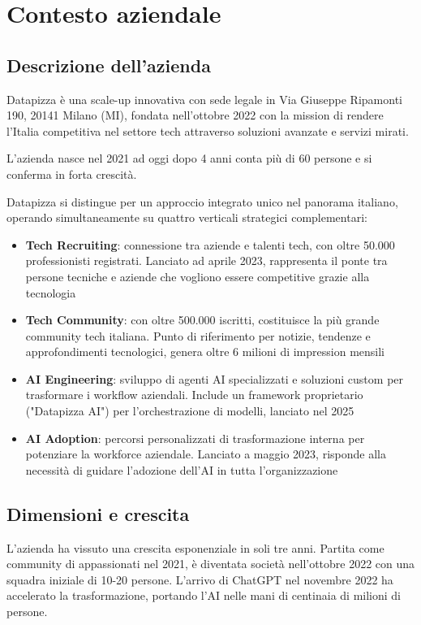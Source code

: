 \chapter{Contesto aziendale}

\section{Descrizione dell'azienda}
Datapizza è una scale-up innovativa con sede legale in Via Giuseppe Ripamonti 190, 20141 Milano (MI), fondata nell'ottobre 2022 con la mission di rendere l'Italia competitiva nel settore tech attraverso soluzioni avanzate e servizi mirati.

L'azienda nasce nel 2021 ad oggi dopo 4 anni conta più di 60 persone e si conferma in forta crescità.

Datapizza si distingue per un approccio integrato unico nel panorama italiano, operando simultaneamente su quattro verticali strategici complementari:

\begin{itemize}
  \item \textbf{Tech Recruiting}: connessione tra aziende e talenti tech, con oltre 50.000 professionisti registrati. Lanciato ad aprile 2023, rappresenta il ponte tra persone tecniche e aziende che vogliono essere competitive grazie alla tecnologia
  
  \item \textbf{Tech Community}: con oltre 500.000 iscritti, costituisce la più grande community tech italiana. Punto di riferimento per notizie, tendenze e approfondimenti tecnologici, genera oltre 6 milioni di impression mensili
  
  \item \textbf{AI Engineering}: sviluppo di agenti AI specializzati e soluzioni custom per trasformare i workflow aziendali. Include un framework proprietario ("Datapizza AI") per l'orchestrazione di modelli, lanciato nel 2025
  
  \item \textbf{AI Adoption}: percorsi personalizzati di trasformazione interna per potenziare la workforce aziendale. Lanciato a maggio 2023, risponde alla necessità di guidare l'adozione dell'AI in tutta l'organizzazione
\end{itemize}

\section{Dimensioni e crescita}
L'azienda ha vissuto una crescita esponenziale in soli tre anni. Partita come community di appassionati nel 2021, è diventata società nell'ottobre 2022 con una squadra iniziale di 10-20 persone. L'arrivo di ChatGPT nel novembre 2022 ha accelerato la trasformazione, portando l'AI nelle mani di centinaia di milioni di persone.

